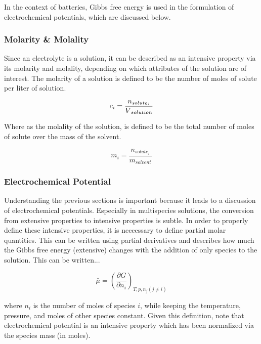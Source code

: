 \documentclass[lettersize,journal]{IEEEtran}
\newcommand{\volume}{{\ooalign{\hfil$V$\hfil\cr\kern0.08em--\hfil\cr}}}
\begin{document}
 In the context of batteries, Gibbs free energy is used in the formulation of electrochemical potentials, which are discussed below.\\


 \subsubsection{Molarity \& Molality}

 Since an electrolyte is a solution, it can be described as an intensive property via its molarity and molality, depending on which attributes of the solution are of interest. The molarity of a solution is defined to be the number of moles of solute per liter of solution.

\begin{equation}\label{molarity}
    c_i = \frac{n_{solute_i}}{{\volume}_{solution}}
\end{equation}


 \noindent Where as the molality of the solution, is defined to be the total number of moles of solute over the mass of the solvent.

 \begin{equation}\label{molality}
     m_i = \frac{n_{solute_i}}{m_{solvent}}
 \end{equation}

 \subsubsection{Electrochemical Potential}

 Understanding the previous sections is important because it leads to a discussion of electrochemical potentials. Especially in multispecies solutions, the conversion from extensive properties to intensive properties is subtle. In order to properly define these intensive properties, it is neccessary to define partial molar quantities. This can be written using partial derivatives and describes how much the Gibbs free energy (extensive) changes with the addition of only species to the solution. This can be written...

 \begin{equation}\label{electrochemical_potential}
     \bar{\mu} = \left( \frac{\partial G}{\partial n_{i}} \right)_{T,p,n_{j} (j \neq i)}
 \end{equation}

 \noindent where $n_i$ is the number of moles of species $i$, while keeping the temperature, pressure, and moles of other species constant.  Given this definition, note that electrochemical potential is an intensive property which has been normalized via the species mass (in moles).\\
\end{document}
